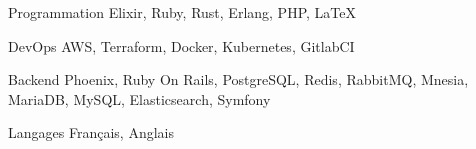 
\begin{cvskills}
  
  \cvskill
    {Programmation}
    {Elixir, Ruby, Rust, Erlang, PHP, LaTeX}

  \cvskill
    {DevOps}
    {AWS, Terraform, Docker, Kubernetes, GitlabCI}

  \cvskill
    {Backend}
    {Phoenix, Ruby On Rails, PostgreSQL, Redis, RabbitMQ, Mnesia, MariaDB, MySQL, Elasticsearch, Symfony}

  \cvskill
    {Langages}
    {Français, Anglais}

\end{cvskills}
